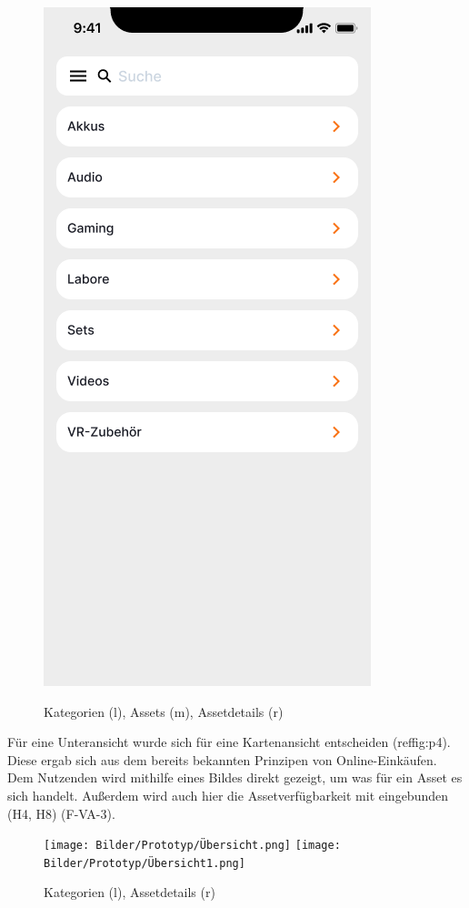\begin{figure}[h]
    \includegraphics[scale=0.3]{Bilder/Prototyp/Neu/Kategorein 1.png}
    \label{fig:p1}
    \caption[Mockup: Kategorien, Assets, Assetdetails]{Kategorien (l), Assets (m), Assetdetails (r)}
\end{figure}

Für eine Unteransicht wurde sich für eine Kartenansicht entscheiden (ref{fig:p4}). Diese ergab sich aus dem
bereits bekannten Prinzipen von Online-Einkäufen. Dem Nutzenden wird mithilfe eines Bildes direkt
gezeigt, um was für ein Asset es sich handelt. Außerdem wird auch hier die Assetverfügbarkeit mit
eingebunden (H4, H8) (F-VA-3).

\begin{figure}[h]
    \centering
    \texttt{[image: Bilder/Prototyp/Übersicht.png]}\hspace{2em}
    \texttt{[image: Bilder/Prototyp/Übersicht1.png]}
    \label{fig:p4}
    \caption[Mockup: Kategorien, Assets, Assetdetails]{Kategorien (l), Assetdetails (r)}
\end{figure}


